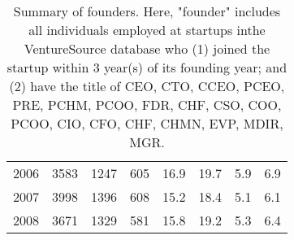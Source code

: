 \begin{table}[!htb]
\begin{tabular}{p{1.75cm}p{1.75cm}p{1.75cm}p{1.75cm}p{1.75cm}p{1.75cm}p{1.75cm}p{1.75cm}}
  2006 & 3583 & 1247 & 605 & 16.9 & 19.7 & 5.9 & 6.9 \\ 
  2007 & 3998 & 1396 & 608 & 15.2 & 18.4 & 5.1 & 6.1 \\ 
  2008 & 3671 & 1329 & 581 & 15.8 & 19.2 & 5.3 & 6.4 \\ 
   \bottomrule
\end{tabular}
\endgroup
\caption{Summary of founders. Here, "founder" includes all individuals employed at startups inthe VentureSource database who (1) joined the startup within 3 year(s) of its founding year; and (2) have the title of CEO, CTO, CCEO, PCEO, PRE, PCHM, PCOO, FDR, CHF, CSO, COO, PCOO, CIO, CFO, CHF, CHMN, EVP, MDIR, MGR.} 
\label{table:GStable_executive}
\end{table}
